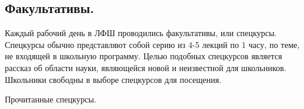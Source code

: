 \documentclass[12pt,a4paper,oneside]{scrartcl}
\newlength{\h}
\newlength{\x}
\begin{document}
\begin{figure}[h]
  \centering
\end{figure}


\subsection{Факультативы.}
\label{sec:elective}

\begin{figure}[h]
  \centering
  \hspace{0.05\textwidth}
\end{figure}

Каждый рабочий день в ЛФШ проводились факультативы, или
спецкурсы. Спецкурсы обычно представляют собой серию из 4-5 лекций по
1 часу, по теме, не входящей в школьную программу. Целью подобных
спецкурсов является рассказ об области науки, являющейся новой и
неизвестной для школьников. Школьники свободны в выборе спецкурсов для
посещения.

\begin{center}
\textsf{Прочитанные спецкурсы.}  
\end{center}
\end{document}
